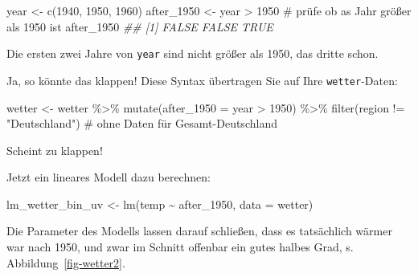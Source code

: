 \documentclass[
  letterpaper,
]{scrbook}
\newenvironment{Shaded}{\begin{snugshade}}{\end{snugshade}}
\newcommand{\AttributeTok}[1]{\textcolor[rgb]{0.40,0.45,0.13}{#1}}
\newcommand{\CommentTok}[1]{\textcolor[rgb]{0.37,0.37,0.37}{#1}}
\newcommand{\DecValTok}[1]{\textcolor[rgb]{0.68,0.00,0.00}{#1}}
\newcommand{\DocumentationTok}[1]{\textcolor[rgb]{0.37,0.37,0.37}{\textit{#1}}}
\newcommand{\FunctionTok}[1]{\textcolor[rgb]{0.28,0.35,0.67}{#1}}
\newcommand{\NormalTok}[1]{\textcolor[rgb]{0.00,0.23,0.31}{#1}}
\newcommand{\OtherTok}[1]{\textcolor[rgb]{0.00,0.23,0.31}{#1}}
\newcommand{\SpecialCharTok}[1]{\textcolor[rgb]{0.37,0.37,0.37}{#1}}
\newcommand{\StringTok}[1]{\textcolor[rgb]{0.13,0.47,0.30}{#1}}
\theoremstyle{definition}
\theoremstyle{definition}
\theoremstyle{definition}
\theoremstyle{remark}
\begin{document}
\begin{Shaded}
\begin{Highlighting}[]
\NormalTok{year }\OtherTok{\textless{}{-}} \FunctionTok{c}\NormalTok{(}\DecValTok{1940}\NormalTok{, }\DecValTok{1950}\NormalTok{, }\DecValTok{1960}\NormalTok{)}
\NormalTok{after\_1950 }\OtherTok{\textless{}{-}}\NormalTok{ year }\SpecialCharTok{\textgreater{}} \DecValTok{1950}  \CommentTok{\# prüfe ob as Jahr größer als 1950 ist}
\NormalTok{after\_1950}
\DocumentationTok{\#\# [1] FALSE FALSE  TRUE}
\end{Highlighting}
\end{Shaded}

Die ersten zwei Jahre von \texttt{year} sind nicht größer als 1950, das
dritte schon.

Ja, so könnte das klappen! Diese Syntax übertragen Sie auf Ihre
\texttt{wetter}-Daten:

\begin{Shaded}
\begin{Highlighting}[]
\NormalTok{wetter }\OtherTok{\textless{}{-}}
\NormalTok{  wetter }\SpecialCharTok{\%\textgreater{}\%} 
  \FunctionTok{mutate}\NormalTok{(}\AttributeTok{after\_1950 =}\NormalTok{ year }\SpecialCharTok{\textgreater{}} \DecValTok{1950}\NormalTok{) }\SpecialCharTok{\%\textgreater{}\%} 
  \FunctionTok{filter}\NormalTok{(region }\SpecialCharTok{!=} \StringTok{"Deutschland"}\NormalTok{)  }\CommentTok{\# ohne Daten für Gesamt{-}Deutschland}
\end{Highlighting}
\end{Shaded}

Scheint zu klappen!

Jetzt ein lineares Modell dazu berechnen:

\begin{Shaded}
\begin{Highlighting}[]
\NormalTok{lm\_wetter\_bin\_uv }\OtherTok{\textless{}{-}} \FunctionTok{lm}\NormalTok{(temp }\SpecialCharTok{\textasciitilde{}}\NormalTok{ after\_1950, }\AttributeTok{data =}\NormalTok{ wetter)}
\end{Highlighting}
\end{Shaded}

Die Parameter des Modells lassen darauf schließen, dass es tatsächlich
wärmer war nach 1950, und zwar im Schnitt offenbar ein gutes halbes
Grad, s. Abbildung~\ref{fig-wetter2}.
\end{document}
